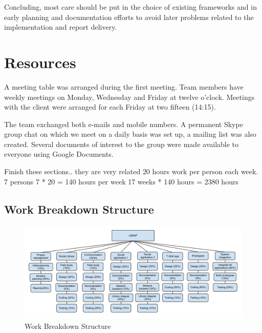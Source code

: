 \begin{table}
\begin{center}
\begin{tabular}{| l | l | l | l | p{2.8cm} | p{3cm} |}
			

		\end{tabular}
	\end{center}	
	\label{table:riskanalysis}
\end{table}

Concluding, most care should be put in the choice of existing frameworks and in early planning
and documentation efforts to avoid later problems related to the implementation and report delivery.

\newpage
\section{Resources}
A meeting table was arranged during the first meeting. Team members
have weekly meetings on Monday, Wednesday and Friday at twelve o'clock.
Meetings with the client were arranged for each Friday at two fifteen (14:15).

The team exchanged both e-mails and mobile numbers. A permanent Skype
group chat on which we meet on a daily basis was set up, a mailing
list was also created. Several documents of interest to the group
were made available to everyone using Google Documents.

\todo
{
 Finish these sections.. they are very related
}
20 hours work per person each week.
7 persons
7 * 20 = 140 hours per week
17 weeks * 140 hours = 2380 hours

\subsection{Work Breakdown Structure}

\begin{figure}[h]
\centering \includegraphics[width=1.1\textwidth]{img/mgmt-wbs.pdf} \caption{Work Breakdown Structure}
\label{fig:mgmt-wbs}
\end{figure}

